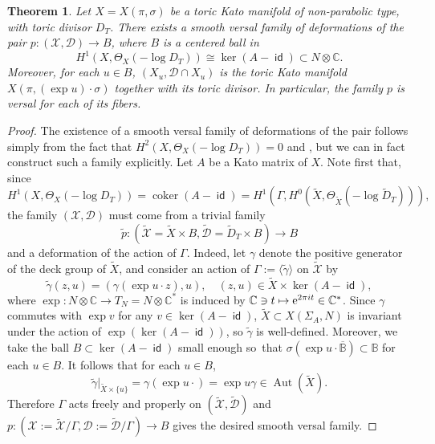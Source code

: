 \documentclass[JEP,XML,SOM,Unicode,NoFloatCountersInSection]{cedram}
\let\mathcal\mathscr
\newtheorem{theorem}{Theorem}[section]
\theoremstyle{definition}
\let\wt\widetilde
\newcommand\mto{\mathchoice{\longmapsto}{\mapsto}{\mapsto}{\mapsto}}
\let\ov\overline
\newcommand{\BB}{\mathbb{B}}
\newcommand{\CC}{\mathbb{C}}
\newcommand{\e}{\mathrm{e}}
\DeclareMathOperator{\Aut}{Aut}
\DeclareMathOperator{\coker}{coker}
\DeclareMathOperator{\id}{\mathsf{id}}
\begin{document}

\begin{theorem}
Let $X=X(\pi,\sigma)$ be a toric Kato manifold of non-parabolic type, with toric divisor $D_T$. There exists a smooth versal family of deformations of the pair $p:(\mathcal X,\mathcal D)\to B$, where $B$ is a centered ball in
\[
H^1(X,\Theta_X(-\log D_T))\cong\ker(A-\id)\subset N\otimes\CC.
\]
Moreover, for each $u\in B$, $(X_u,\mathcal D\cap X_u)$ is the toric Kato manifold $X(\pi,(\exp u)\cdot\sigma)$ together with its toric divisor. In particular, the family $p$ is versal for each of its fibers.
\end{theorem}
\begin{proof}
The existence of a smooth versal family of deformations of the pair follows simply from the fact that $H^2(X,\Theta_X(-\log D_T))=0$ and \cite{kns}, but we can in fact construct such a family explicitly. Let $A$ be a Kato matrix of $X$. Note first that, since
\begin{equation*}
H^1(X,\Theta_X(-\log D_T))=\coker(A-\id)=H^1(\Gamma,H^0(\wt{X},\Theta_{\wt{X}}(-\log\wt{D}_T))),
\end{equation*}
the family $(\mathcal X,\mathcal D)$ must come from a trivial family
\begin{equation*}
\wt{p}:(\wt{\mathcal X}=\wt{X}\times B,\wt{\mathcal D}=\wt{D}_T\times B)\to B
\end{equation*}
and a deformation of the action of $\Gamma$. Indeed, let $\gamma$ denote the positive generator of the deck group of $\wt{X}$, and consider an action of $\Gamma:=\langle \wt{\gamma}\rangle$ on $\wt{\mathcal X}$ by
\begin{equation*}
\wt{\gamma}(z,u)=(\gamma(\exp u\cdot z),u), \quad (z,u)\in \wt{X}\times \ker(A-\id),
\end{equation*}
where $\exp:N\otimes\CC\to T_N=N\otimes\CC^*$ is induced by $\CC\ni t\mto \e^{2\pi it}\in\CC^*$. Since $\gamma$ commutes with $\exp v$ for any $v\in\ker(A-\id)$, $\wt{X}\subset X(\Sigma_A,N)$ is invariant under the action of $\exp(\ker(A-\id))$, so $\wt{\gamma}$ is well-defined. Moreover, we take the ball $B\subset \ker(A-\id)$ small enough so~that $\sigma(\exp u\cdot \ov{\BB})\subset\BB$ for each $u\in B$. It follows that for each $u\in B$,
\begin{equation*}
\wt{\gamma}|_{\wt{X}\times \{u\}}=\gamma(\exp u\cdot)=\exp u\gamma\in \Aut(\wt{X}).
\end{equation*}
Therefore $\Gamma$ acts freely and properly on $(\wt{\mathcal X},\wt{\mathcal D})$ and $p:(\mathcal X:=\wt{\mathcal X}/\Gamma, \mathcal D:=\wt{\mathcal D}/\Gamma)\to B$ gives the desired smooth versal family.
\end{proof}
\end{document}

